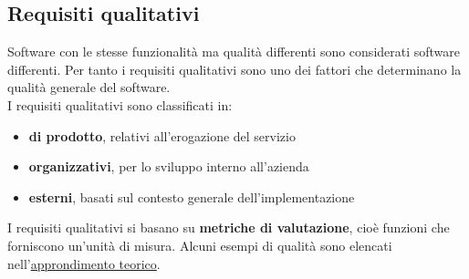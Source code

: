 \subsection{Requisiti qualitativi}
Software con le stesse funzionalità ma qualità differenti sono considerati software differenti. Per tanto i requisiti qualitativi sono uno dei fattori che determinano la qualità generale del software. \\
I requisiti qualitativi sono classificati in:
\begin{itemize}
    \item \textbf{di prodotto}, relativi all'erogazione del servizio
    \item \textbf{organizzativi}, per lo sviluppo interno all'azienda
    \item \textbf{esterni}, basati sul contesto generale dell'implementazione
\end{itemize}
I requisiti qualitativi si basano su \textbf{metriche di valutazione}, cioè funzioni che forniscono un'unità di misura. Alcuni esempi di qualità sono elencati nell'\hyperref[appendix:qualities]{approndimento teorico}.

